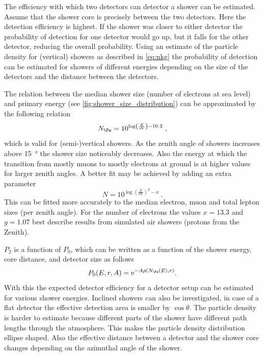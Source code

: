 The efficiency with which two detectors can detector a shower can be estimated. Assume that the shower core is precisely between the two detectors. Here the detection efficiency is highest. If the shower was closer to either detector the probability of detection for one detector would go up, but it falls for the other detector, reducing the overall probability. Using an estimate of the particle density for (vertical) showers as described in \cref{eq:nkg} the probability of detection can be estimated for showers of different energies depending on the size of the detectors and the distance between the detectors.

The relation between the median shower size (number of electrons at sea level) and primary energy (see \cref{fig:shower_size_distribution}) can be approximated by the following relation
%
\begin{equation}
    N_{\Pe} = 10^{\log\left(\frac{E}{\si{\eV}}\right) - 10.2} \ ,
\end{equation}
%
which is valid for (semi-)vertical showers. As the zenith angle of showers increases above \SI{15}{\degree} the shower size noticeably decreases. Also the energy at which the transition from mostly muons to mostly electrons at ground is at higher values for larger zenith angles. A better fit may be achieved by adding an extra parameter
%
\begin{equation}
    N = 10^{\log\left(\frac{E}{\si{\eV}}\right)^y - x} \ .
\end{equation}
%
This can be fitted more accurately to the median electron, muon and total lepton sizes (per zenith angle). For the number of electrons the values $x = 13.3$ and $y = 1.07$ best describe results from simulated air showers (protons from the Zenith).

$P_2$ is a function of $P_0$, which can be written as a function of the shower energy, core distance, and detector size as follows
%
\begin{equation}
    P_0(E, r, A) = \mathrm{e}^{-A\rho(N_{\Pe}(E), r)} \\ .
\end{equation}
%
With this the expected detector efficiency for a detector setup can be estimated for various shower energies. Inclined showers can also be investigated, in case of a flat detector the effective detection area is smaller by $\cos \theta$. The particle density is harder to estimate because different parts of the shower have different path lengths through the atmosphere. This makes the particle density distribution ellipse shaped. Also the effective distance between a detector and the shower core changes depending on the azimuthal angle of the shower.

